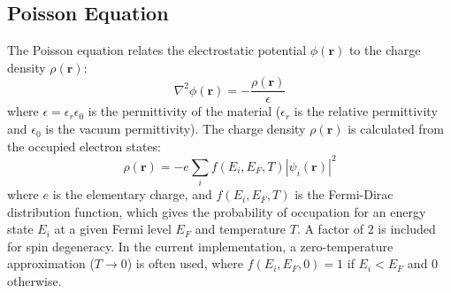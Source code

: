 \documentclass{article}
\begin{document}
\subsection{Poisson Equation}
The Poisson equation relates the electrostatic potential $\phi(\mathbf{r})$ to the charge density $\rho(\mathbf{r})$:
\begin{equation}
    \nabla^2 \phi(\mathbf{r}) = -\frac{\rho(\mathbf{r})}{\epsilon}
\end{equation}
where $\epsilon = \epsilon_r \epsilon_0$ is the permittivity of the material ($\epsilon_r$ is the relative permittivity and $\epsilon_0$ is the vacuum permittivity). The charge density $\rho(\mathbf{r})$ is calculated from the occupied electron states:
\begin{equation}
    \rho(\mathbf{r}) = -e \sum_i f(E_i, E_F, T) |\psi_i(\mathbf{r})|^2
\end{equation}
where $e$ is the elementary charge, and $f(E_i, E_F, T)$ is the Fermi-Dirac distribution function, which gives the probability of occupation for an energy state $E_i$ at a given Fermi level $E_F$ and temperature $T$. A factor of 2 is included for spin degeneracy. In the current implementation, a zero-temperature approximation ($T \to 0$) is often used, where $f(E_i, E_F, 0) = 1$ if $E_i < E_F$ and $0$ otherwise.
\end{document}

